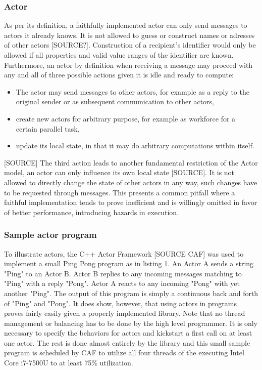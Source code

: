 \documentclass[A4]{article}
\begin{document}
\subsubsection{Actor}
As per its definition, a faithfully implemented actor can only send messages to actors it already knows. It is not allowed to guess or construct names or adresses of other actors [SOURCE?]. Construction of a recipient's identifier would only be allowed if all properties and valid value ranges of the identifier are known. 
Furthermore, an actor by definition when receiving a message may proceed with any and all of three possible actions given it is idle and ready to compute: 
\begin{itemize}
\item The actor may send messages to other actors, for example as a reply to the original sender or as subsequent communication to other actors,
\item create new actors for arbitrary purpose, for example as workforce for a certain parallel task,
\item update its local state, in that it may do arbitrary computations within itself.
\end{itemize}[SOURCE]
The third action leads to another fundamental restriction of the Actor model, an actor can only influence its own local state [SOURCE]. It is not allowed to directly change the state of other actors in any way, such changes have to be requested through messages. This presents a common pitfall where a faithful implementation tends to prove inefficient and is willingly omitted in favor of better performance, introducing hazards in execution. 
\subsubsection{Sample actor program}
To illustrate actors, the C++ Actor Framework [SOURCE CAF] was used to implement a small Ping Pong program as in listing 1. An Actor A sends a string "Ping" to an Actor B. Actor B replies to any incoming messages matching to "Ping" with a reply "Pong". Actor A reacts to any incoming "Pong" with yet another "Ping".
The output of this program is simply a continuous back and forth of "Ping" and "Pong". It does show, however, that using actors in programs proves fairly easily given a properly implemented library. Note that no thread management or balancing has to be done by the high level programmer. It is only necessary to specify the behaviors for actors and kickstart a first call on at least one actor. The rest is done almost entirely by the library and this small sample program is scheduled by CAF to utilize all four threads of the executing Intel Core i7-7500U to at least 75\% utilization. 
\end{document}
